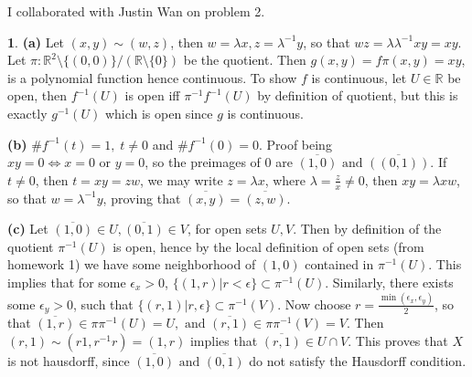 \documentclass[10.5pt]{article}
\theoremstyle{definition}
\newtheorem{pb}{}
\newcommand{\set}[1]{\{#1\}}
\newcommand{\tand}{\text{ and }}
\newcommand{\tor}{\text{ or }}
\begin{document}
    I collaborated with Justin Wan on problem 2.

    \begin{pb}
        \textbf{(a)} Let \((x,y) \sim (w,z)\), then \(w = \lambda x, z = \lambda^{-1} y\), so that \(wz = \lambda \lambda^{-1}xy = xy\).
        Let \(\pi: \mathbb{R}^2 \setminus \set{(0,0)}/(\mathbb{R}\setminus \set{0})\) be the quotient. Then \(g(x,y) = f\pi(x,y) = xy\), is a polynomial function hence continuous.
        To show \(f\) is continuous, let \(U \in \mathbb{R}\) be open, then \(f^{-1}(U)\) is open iff \(\pi^{-1}f^{-1}(U)\) by definition of quotient, but this is exactly \(g^{-1}(U)\)
        which is open since \(g \) is continuous.

        \textbf{(b)} \(\# f^{-1}(t) = 1, \; t \neq 0\) and \(\# f^{-1}(0) = 0\). Proof being \(xy = 0 \iff x = 0 \tor y = 0\), so the preimages of \(0\) are \(\overline{(1,0)} \tand \overline{((0,1))}\).
        If \(t \neq 0\), then \(t = xy = zw\), we may write \(z = \lambda x\), where \(\lambda = \frac{z }{x } \neq 0 \), then \(xy = \lambda x w\), so that \(w = \lambda^{-1}y\), proving that
        \(\overline{(x,y)} = \overline{(z,w )}\).

        \textbf{(c)} Let \(\overline{(1,0)} \in U, \overline{(0,1)} \in V\), for open sets \(U, V \). Then by definition of the quotient \(\pi^{-1}(U)\) is open, hence by the local definition of open sets (from homework 1)
        we have some neighborhood of \((1,0)\) contained in \(\pi^{-1}(U)\). This implies that for some \(\epsilon_x > 0\), \(\set{(1,r ) \vert r < \epsilon} \subset \pi^{-1}(U)\). Similarly, there exists some
        \(\epsilon_y > 0\), such that \(\set{(r,1) \vert r , \epsilon} \subset \pi^{-1}(V)\). Now choose \(r = \frac{\min{(\epsilon_x,\epsilon_y )}}{2}\), so that
        \(\overline{(1,r)} \in \pi\pi^{-1}(U) = U, \tand \overline{(r,1)} \in \pi\pi^{-1}(V) = V\). Then \((r,1) \sim (r1, r^{-1}r) = (1,r)\) implies that \(\overline{(r,1)} \in U \cap V \). This proves that
        \(X \) is not hausdorff, since \(\overline{(1,0)} \tand \overline{(0,1)}\) do not satisfy the Hausdorff condition.


\end{pb}
\end{document}
